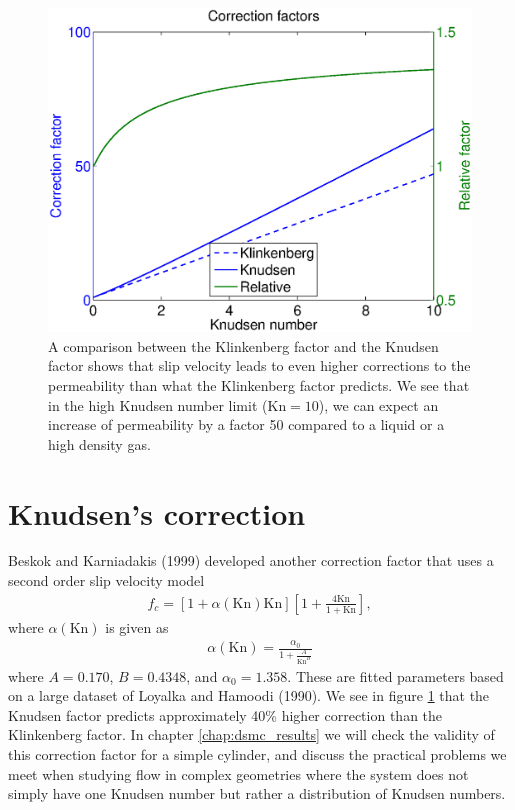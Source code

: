 \begin{figure}[h]
\begin{center}
\includegraphics[width=\textwidth, trim=0cm 0cm 0cm 0cm, clip]{figures/klinkenberg.eps}
\end{center}
\caption{A comparison between the Klinkenberg factor and the Knudsen factor shows that slip velocity leads to even higher corrections to the permeability than what the Klinkenberg factor predicts. We see that in the high Knudsen number limit ($\text{Kn}=10$), we can expect an increase of permeability by a factor 50 compared to a liquid or a high density gas.}
\label{fig:klinkenberg_correction_factor}
\end{figure}

\section{Knudsen's correction}
\label{sec:knudsen_correction}
Beskok and Karniadakis (1999) developed another correction factor that uses a second order slip velocity model 
\begin{align}
	\label{eq:knudsen_correction}
	f_c = [1 + \alpha(\text{Kn})\text{Kn}]\left[1 + \frac{4\text{Kn}}{ 1 + \text{Kn}}\right],
\end{align}
where $\alpha(\text{Kn})$ is given as\cite{civan2010effective}
\begin{align}
	\alpha(\text{Kn}) = \frac{\alpha_0}{1 + \frac{A}{\text{Kn}^B}}
\end{align} 
where $A=0.170$, $B=0.4348$, and $\alpha_0=1.358$. These are fitted parameters based on a large dataset of Loyalka and Hamoodi (1990). We see in figure \ref{fig:klinkenberg_correction_factor} that the Knudsen factor predicts approximately 40\% higher correction than the Klinkenberg factor. In chapter \ref{chap:dsmc_results} we will check the validity of this correction factor for a simple cylinder, and discuss the practical problems we meet when studying flow in complex geometries where the system does not simply have one Knudsen number but rather a distribution of Knudsen numbers.